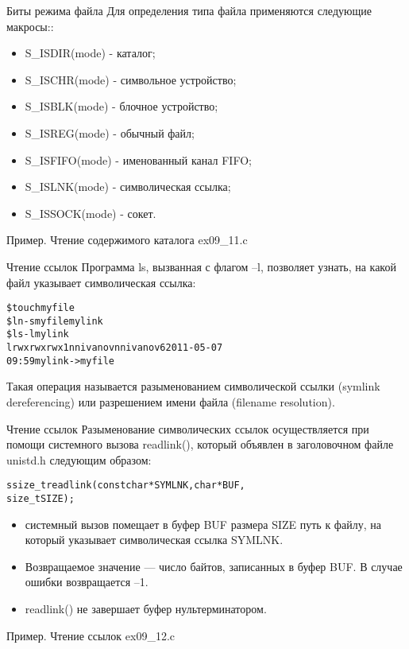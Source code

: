 \documentclass{beamer}
\begin{document}
\begin{frame}[fragile]{Биты режима файла}
Для определения типа файла применяются следующие макросы::
\begin{itemize}
\item S\_ISDIR(mode) - каталог;
\item S\_ISCHR(mode) - символьное устройство;
\item S\_ISBLK(mode) - блочное устройство;
\item S\_ISREG(mode) - обычный файл;
\item S\_ISFIFO(mode) - именованный канал FIFO;
\item S\_ISLNK(mode) - символическая ссылка;
\item S\_ISSOCK(mode) - сокет.
\end{itemize}
\begin{block}{Пример. Чтение содержимого каталога}
ex09\_11.c
\end{block}
\end{frame}

\begin{frame}[fragile]{Чтение ссылок}
Программа ls, вызванная с флагом –l, позволяет узнать, на какой файл указывает
символическая ссылка:
\begin{alltt}
\$ touch myfile
\$ ln -s myfile mylink
\$ ls -l mylink
lrwxrwxrwx 1 nnivanov nnivanov 6 2011-05-07 
    09:59 mylink -> myfile
\end{alltt}
Такая операция называется разыменованием символической ссылки (symlink dereferencing) или разрешением имени файла (filename resolution).
\end{frame}

\begin{frame}[fragile]{Чтение ссылок}
Разыменование символических ссылок осуществляется при помощи системного вызова readlink(),
который объявлен в заголовочном файле unistd.h следующим образом:
\begin{alltt}
ssize_t readlink (const char * SYMLNK, char * BUF, 
   size_t SIZE);
\end{alltt}
\begin{itemize}
\item системный вызов помещает в буфер BUF размера SIZE путь к файлу, на который указывает символическая ссылка SYMLNK. 
\item Возвращаемое значение — число байтов, записанных в буфер BUF. В случае ошибки возвращается –1.
\item readlink() не завершает буфер нультерминатором.
\end{itemize}
\begin{block}{Пример. Чтение ссылок}
ex09\_12.c
\end{block}
\end{frame}


\end{document}
